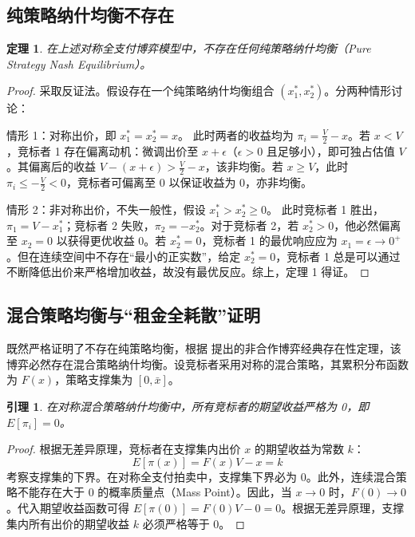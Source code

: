 \documentclass[11pt, a4paper, UTF8]{chinese-erj}
\newtheorem{theorem}{定理}
\newtheorem{lemma}{引理}
\begin{document}
\subsection{纯策略纳什均衡不存在}

\begin{theorem}
在上述对称全支付博弈模型中，不存在任何纯策略纳什均衡（Pure Strategy Nash Equilibrium）。
\end{theorem}

\begin{proof}
采取反证法。假设存在一个纯策略纳什均衡组合 $(x_1^*, x_2^*)$。分两种情形讨论：

情形 1：对称出价，即 $x_1^* = x_2^* = x$。
此时两者的收益均为 $\pi_i = \frac{V}{2} - x$。若 $x < V$，竞标者 1 存在偏离动机：微调出价至 $x + \epsilon$（$\epsilon > 0$ 且足够小），即可独占估值 $V$。其偏离后的收益 $V - (x + \epsilon) > \frac{V}{2} - x$，该非均衡。若 $x \ge V$，此时 $\pi_i \le -\frac{V}{2} < 0$，竞标者可偏离至 $0$ 以保证收益为 $0$，亦非均衡。

情形 2：非对称出价，不失一般性，假设 $x_1^* > x_2^* \ge 0$。
此时竞标者 1 胜出，$\pi_1 = V - x_1^*$；竞标者 2 失败，$\pi_2 = -x_2^*$。对于竞标者 2，若 $x_2^* > 0$，他必然偏离至 $x_2 = 0$ 以获得更优收益 $0$。若 $x_2^* = 0$，竞标者 1 的最优响应应为 $x_1 = \epsilon \to 0^+$。但在连续空间中不存在“最小的正实数”，给定 $x_2^* = 0$，竞标者 1 总是可以通过不断降低出价来严格增加收益，故没有最优反应。综上，定理 1 得证。
\end{proof}

\subsection{混合策略均衡与“租金全耗散”证明}

既然严格证明了不存在纯策略均衡，根据 \textcite{Nash1951} 提出的非合作博弈经典存在性定理，该博弈必然存在混合策略纳什均衡。设竞标者采用对称的混合策略，其累积分布函数为 $F(x)$，策略支撑集为 $[0, \bar{x}]$。

\begin{lemma}
在对称混合策略纳什均衡中，所有竞标者的期望收益严格为 0，即 $E[\pi_i] = 0$。
\end{lemma}

\begin{proof}
根据无差异原理，竞标者在支撑集内出价 $x$ 的期望收益为常数 $k$：
$$E[\pi(x)] = F(x)V - x = k$$
考察支撑集的下界。在对称全支付拍卖中，支撑集下界必为 0。此外，连续混合策略不能存在大于 0 的概率质量点（Mass Point）。因此，当 $x \to 0$ 时，$F(0) \to 0$。代入期望收益函数可得 $E[\pi(0)] = F(0)V - 0 = 0$。根据无差异原理，支撑集内所有出价的期望收益 $k$ 必须严格等于 0。
\end{proof}
\end{document}
